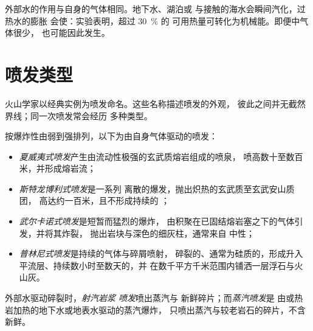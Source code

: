 外部水的作用与自身的气体相同。地下水、湖泊或
与接触的海水会瞬间汽化，过热水的膨胀
会使：实验表明，超过 \qty{30}{\percent} 的
可用热量可转化为机械能。即便中气体很少，
也可能因此发生。

\section{喷发类型}

火山学家以经典实例为喷发命名。这些名称描述喷发的外观，
彼此之间并无截然界线；同一次喷发常会经历
多种类型。

\begin{definition}[喷发类型]\label{def:b2:eruptive-styles:styles}
按爆炸性由弱到强排列，以下为由自身气体驱动的喷发：
\begin{itemize}
\item \emph{夏威夷式喷发}产生由流动性极强的玄武质熔岩组成的喷泉，
喷高数十至数百米，并形成熔岩流；
\item \emph{斯特龙博利式喷发}是一系列
离散的爆发，抛出炽热的玄武质至玄武安山质团，
高达约一百米，且不形成持续的
；
\item \emph{武尔卡诺式喷发}是短暂而猛烈的爆炸，
由积聚在已固结熔岩塞之下的气体引发，并将其炸裂，
抛出岩块与深色的细灰柱，通常来自
中性；
\item \emph{普林尼式喷发}是持续的气体与碎屑喷射，
碎裂的、通常为硅质的，形成升入
平流层、持续数小时至数天的，并
在数千平方千米范围内铺洒一层浮石与火山灰。
\end{itemize}
外部水驱动碎裂时，\emph{射汽岩浆
喷发}喷出蒸汽与
新鲜碎片；而\emph{蒸汽喷发}是
由或热岩加热的地下水或地表水驱动的蒸汽爆炸，
只喷出蒸汽与较老岩石的碎片，不含新鲜。
\end{definition}

